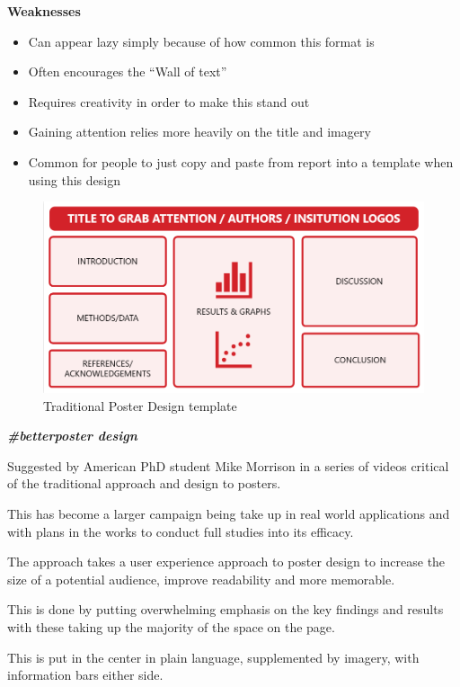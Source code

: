 \documentclass[
]{book}
\providecommand{\tightlist}{%
  \setlength{\itemsep}{0pt}\setlength{\parskip}{0pt}}
\begin{document}
\textbf{Weaknesses}

\begin{itemize}
\tightlist
\item
  Can appear lazy simply because of how common this format is
\item
  Often encourages the ``Wall of text''
\item
  Requires creativity in order to make this stand out
\item
  Gaining attention relies more heavily on the title and imagery
\item
  Common for people to just copy and paste from report into a template when using this design
\end{itemize}

\begin{figure}
\centering
\includegraphics{img/Traditional Poster design template.png}
\caption{Traditional Poster Design template}
\end{figure}

\textbf{\emph{\#betterposter design}}

Suggested by American PhD student Mike Morrison in a series of videos critical of the traditional approach and design to posters.

This has become a larger campaign being take up in real world applications and with plans in the works to conduct full studies into its efficacy.

The approach takes a user experience approach to poster design to increase the size of a potential audience, improve readability and more memorable.

This is done by putting overwhelming emphasis on the key findings and results with these taking up the majority of the space on the page.

This is put in the center in plain language, supplemented by imagery, with information bars either side.
\end{document}

